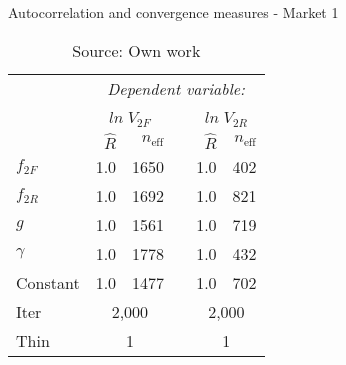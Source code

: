 \begin{table}[ht]
\caption{Autocorrelation and convergence measures - Market 1}
\label{mkt1_T_autocorr_convergence}
\centering
\begin{tabular}{lrrrrr}
\toprule 
 & \multicolumn{5}{c}{\textit{Dependent variable:}} \\ 
\cline{2-6} 
\\[-1.8ex] & \multicolumn{2}{c}{$ln \; V_{2F}$} & & \multicolumn{2}{c}{ $ln \; V_{2R}$}\\ 
\cline{2-3} \cline{5-6}
 & $\hat{R}$ & $n_{\text{eff}}$ & &$\hat{R}$ & $n_{\text{eff}}$ \\ 
  \midrule

  $f_{2F}$ & 1.0 & 1650 & & 1.0 & 402 \\ 
  $f_{2R}$ & 1.0 & 1692 & & 1.0 & 821 \\ 
  $g$      & 1.0 & 1561 & & 1.0 & 719 \\ 
  $\gamma$ & 1.0 & 1778 & & 1.0 & 432 \\ 
  Constant & 1.0 & 1477 & & 1.0 & 702 \\ 
   \hline
   Iter    & \multicolumn{2}{c}{2,000} && \multicolumn{2}{c}{2,000} \\
   Thin    & \multicolumn{2}{c}{1} && \multicolumn{2}{c}{1} \\
   \bottomrule
\end{tabular}
\caption*{Source: Own work}
\end{table}